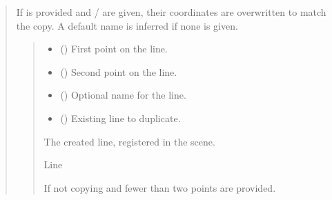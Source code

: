 \documentclass[letterpaper,10pt,english]{sphinxmanual}
\begin{document}
\begin{quote}
\begin{fulllineitems}
\begin{fulllineitems}
\sphinxAtStartPar
If  is provided and / are given,
their coordinates are overwritten to match the copy. A default name
is inferred if none is given.
\begin{quote}\begin{description}
\begin{itemize}
\item {} 
\sphinxAtStartPar
{} (\sphinxstyleliteralemphasis{\sphinxupquote{ | }}) \textendash{} First point on the line.

\item {} 
\sphinxAtStartPar
{} (\sphinxstyleliteralemphasis{\sphinxupquote{ | }}) \textendash{} Second point on the line.

\item {} 
\sphinxAtStartPar
{} (\sphinxstyleliteralemphasis{\sphinxupquote{ | }}) \textendash{} Optional name for the line.

\item {} 
\sphinxAtStartPar
{} (\sphinxstyleliteralemphasis{\sphinxupquote{ | }}) \textendash{} Existing line to duplicate.

\end{itemize}

\sphinxAtStartPar
The created line, registered in the scene.

\sphinxAtStartPar
Line

\sphinxAtStartPar
{} \textendash{} If not copying and fewer than two points are provided.

\end{description}\end{quote}

\end{fulllineitems}


\end{fulllineitems}
\end{quote}
\end{document}
